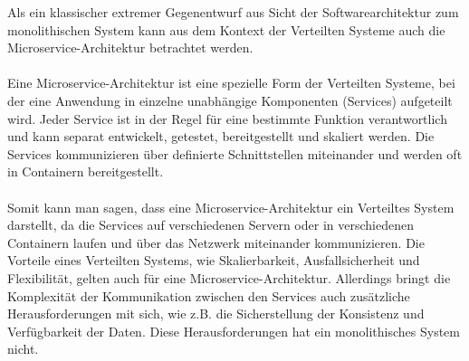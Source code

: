 \documentclass[../vs-script-first-v01.tex]{subfiles}
\begin{document}
Als ein klassischer extremer Gegenentwurf aus Sicht der Softwarearchitektur zum monolithischen System kann aus dem Kontext der Verteilten Systeme auch die Microservice-Architektur\cite{fowler2014microservices} betrachtet werden.
\\\\
Eine Microservice-Architektur ist eine spezielle Form der Verteilten Systeme, bei der eine Anwendung in einzelne unabhängige Komponenten (Services) aufgeteilt wird. Jeder Service ist in der Regel für eine bestimmte Funktion verantwortlich und kann separat entwickelt, getestet, bereitgestellt und skaliert werden. Die Services kommunizieren über definierte Schnittstellen miteinander und werden oft in Containern bereitgestellt.
\\\\
Somit kann man sagen, dass eine Microservice-Architektur ein Verteiltes System darstellt, da die Services auf verschiedenen Servern oder in verschiedenen Containern laufen und über das Netzwerk miteinander kommunizieren. Die Vorteile eines Verteilten Systems, wie Skalierbarkeit, Ausfallsicherheit und Flexibilität, gelten auch für eine Microservice-Architektur. Allerdings bringt die Komplexität der Kommunikation zwischen den Services auch zusätzliche Herausforderungen mit sich, wie z.B. die Sicherstellung der Konsistenz und Verfügbarkeit der Daten. Diese Herausforderungen hat ein monolithisches System nicht.
\end{document}
